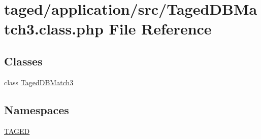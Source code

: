 \hypertarget{_taged_d_b_match3_8class_8php}{}\section{taged/application/src/\+Taged\+D\+B\+Match3.class.\+php File Reference}
\label{_taged_d_b_match3_8class_8php}
\subsection*{Classes}
\begin{DoxyCompactItemize}
\item 
class \hyperlink{class_taged_d_b_match3}{Taged\+D\+B\+Match3}
\end{DoxyCompactItemize}
\subsection*{Namespaces}
\begin{DoxyCompactItemize}
\item 
 \hyperlink{namespace_t_a_g_e_d}{T\+A\+G\+ED}
\end{DoxyCompactItemize}
